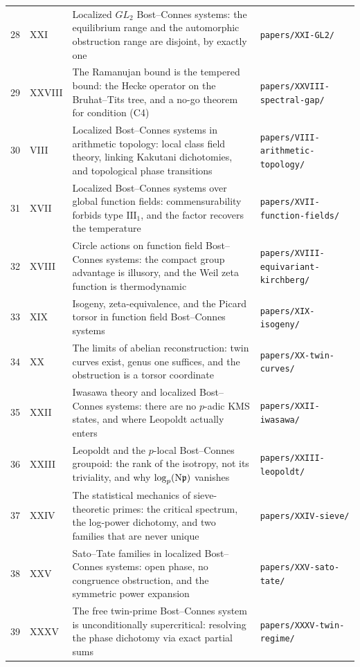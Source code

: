 \begin{center}
\begin{longtable}{rlp{7.4cm}p{4.6cm}}
28 & XXI & Localized $GL_2$ Bost--Connes systems:  the equilibrium range and the automorphic obstruction range  are disjoint, by exactly one & \nolinkurl{papers/XXI-GL2/}\\
29 & XXVIII & The Ramanujan bound is the tempered bound:  the Hecke operator on the Bruhat--Tits tree, and  a no-go theorem for condition (C4) & \nolinkurl{papers/XXVIII-spectral-gap/}\\
30 & VIII & Localized Bost--Connes systems in arithmetic topology:  local class field theory, linking Kakutani dichotomies,  and topological phase transitions & \nolinkurl{papers/VIII-arithmetic-topology/}\\
31 & XVII & Localized Bost--Connes systems over global function fields:  commensurability forbids type $\mathrm{III}_1$,  and the factor recovers the temperature & \nolinkurl{papers/XVII-function-fields/}\\
32 & XVIII & Circle actions on function field Bost--Connes systems:  the compact group advantage is illusory,  and the Weil zeta function is thermodynamic & \nolinkurl{papers/XVIII-equivariant-kirchberg/}\\
33 & XIX & Isogeny, zeta-equivalence, and the Picard torsor  in function field Bost--Connes systems & \nolinkurl{papers/XIX-isogeny/}\\
34 & XX & The limits of abelian reconstruction:  twin curves exist, genus one suffices,  and the obstruction is a torsor coordinate & \nolinkurl{papers/XX-twin-curves/}\\
35 & XXII & Iwasawa theory and localized Bost--Connes systems:  there are no $p$-adic KMS states,  and where Leopoldt actually enters & \nolinkurl{papers/XXII-iwasawa/}\\
36 & XXIII & Leopoldt and the $p$-local Bost--Connes groupoid:  the rank of the isotropy, not its triviality,  and why $\log_p(\mathrm{N}\mathfrak{p})$ vanishes & \nolinkurl{papers/XXIII-leopoldt/}\\
37 & XXIV & The statistical mechanics of sieve-theoretic primes:  the critical spectrum, the log-power dichotomy,  and two families that are never unique & \nolinkurl{papers/XXIV-sieve/}\\
38 & XXV & Sato--Tate families in localized Bost--Connes systems:  open phase, no congruence obstruction,  and the symmetric power expansion & \nolinkurl{papers/XXV-sato-tate/}\\
39 & XXXV & The free twin-prime Bost--Connes system is unconditionally supercritical:  resolving the phase dichotomy via exact partial sums & \nolinkurl{papers/XXXV-twin-regime/}\\
\hline
\end{longtable}
\end{center}
